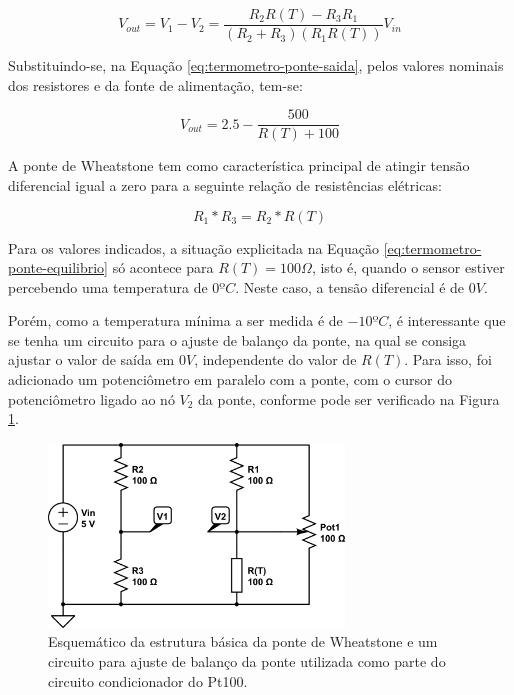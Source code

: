 \documentclass[a4paper]{instrumentacao}
\begin{document}
\begin{equation}
	V_{out}=V_1-V_2=\frac{R_2R(T)-R_3R_1}{(R_2+R_3)(R_1R(T))}V_{in}
	\label{eq:termometro-ponte-saida}
\end{equation}

Substituindo-se, na Equação \ref{eq:termometro-ponte-saida}, pelos valores nominais dos resistores e da fonte de alimentação, tem-se:

\begin{equation}
	V_{out}=2.5-\frac{500}{R(T)+100}
	\label{eq:termometro-ponte-saida-valores}
\end{equation}

A ponte de Wheatstone tem como característica principal de atingir tensão diferencial igual a zero para a seguinte relação de resistências elétricas:

 \begin{equation}
	R_1*R_3=R_2*R(T)
	\label{eq:termometro-ponte-equilibrio}
\end{equation}

Para os valores indicados, a situação explicitada na Equação \ref{eq:termometro-ponte-equilibrio} só acontece para $R(T)=100\Omega$, isto é, quando o sensor estiver percebendo uma temperatura de $0ºC$. Neste caso, a tensão diferencial é de $0V$.

Porém, como a temperatura mínima a ser medida é de $-10ºC$, é interessante que se tenha um circuito para o ajuste de balanço da ponte, na qual se consiga ajustar o valor de   saída em $0V$, independente do valor de $R(T)$. Para isso, foi adicionado um potenciômetro em paralelo com a ponte, com o cursor do potenciômetro ligado ao nó $V_2$ da ponte, conforme pode ser verificado na Figura \ref{fig:termometro-ponte-balanco}.

\begin{figure}[H]
	\centering \includegraphics[width=0.7\textwidth]{pt100-ponte-balanco.png}
	\caption{Esquemático da estrutura básica da ponte de Wheatstone e um circuito para ajuste de balanço da ponte utilizada como parte do circuito condicionador do Pt100.}
	\label{fig:termometro-ponte-balanco}
\end{figure}
\end{document}
